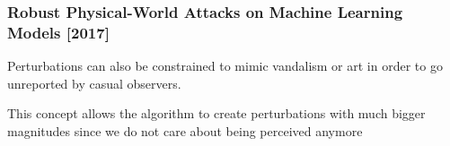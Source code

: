 \documentclass[9pt]{beamer}
\begin{document}
\begin{frame}
  \frametitle{Robust Physical-World Attacks on Machine Learning Models [2017]}

  Perturbations can also be constrained to mimic vandalism or art in
  order to go unreported by casual observers.

  \bigskip

  This concept allows the algorithm to create perturbations with much
  bigger magnitudes since we do not care about being perceived anymore

  \begin{center}
  \end{center}
\end{frame}
\end{document}
